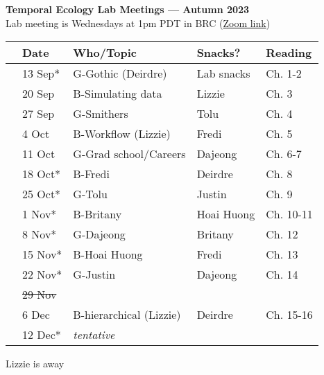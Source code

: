 \documentclass[11pt]{article}
\begin{document}
 
\raggedright
{}

\begin{center} 
{\large \textbf{Temporal Ecology Lab Meetings --- Autumn 2023}} \\ [2pt]
Lab meeting is Wednesdays at 1pm PDT in BRC (\href{https://ubc.zoom.us/j/69225274563?pwd=Vmd5NG1QL2h2bTRsQVVTYWJSb0hvQT09}{Zoom link})\\ %
\end{center} 

\begin{center}
\begin{tabular}{ p{0.2 cm}  p{2 cm}  p{4.5 cm}  p{3 cm}  p{3.5 cm} }  \hline \hline
 & \textbf{Date}
   & \textbf{Who/Topic}
      & \textbf{Snacks?} 
         & \textbf{Reading} \\ 
\hline \hline
&13 Sep* & G-Gothic (Deirdre)  &   Lab snacks    & Ch. 1-2 \\\hline
 & 20 Sep & B-Simulating data & Lizzie & Ch. 3 \\\hline
 & 27 Sep & G-Smithers & Tolu & Ch. 4 \\\hline  
 & 4 Oct &  B-Workflow (Lizzie)   & Fredi &  Ch. 5 \\\hline
 & 11 Oct  & G-Grad school/Careers  & Dajeong &  Ch. 6-7 \\\hline 
 & 18 Oct* & B-Fredi & Deirdre & Ch. 8  \\\hline
 & 25 Oct*  & G-Tolu & Justin & Ch. 9\\\hline
 & 1 Nov* &  B-Britany  & Hoai Huong & Ch. 10-11  \\\hline 
  & 8 Nov*  &  G-Dajeong & Britany &  Ch. 12 \\\hline
 & 15 Nov*  &  B-Hoai Huong  & Fredi &  Ch. 13\\\hline
  & 22 Nov*  &  G-Justin & Dajeong & Ch. 14 \\\hline
 & \sout{29 Nov}  &    &  &  \\\hline
 & 6 Dec  & B-hierarchical (Lizzie)    & Deirdre & Ch. 15-16 \\\hline
 & 12 Dec*  &  \emph{tentative}    &  & \\\hline
\hline
\end{tabular}
\end{center}
\noindent *Lizzie is away \\
\end{document}
